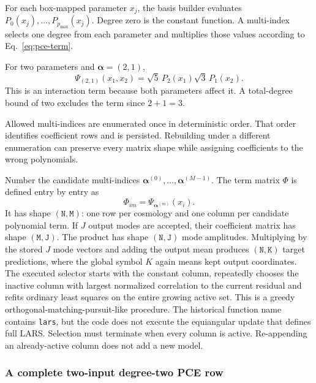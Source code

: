 \documentclass[10pt,aps,prd,twocolumn,nofootinbib]{revtex4-2}
\newcommand{\code}[1]{\texttt{#1}}
\newcommand{\shape}[1]{\ensuremath{\mathtt{#1}}}
\begin{document}
For each box-mapped parameter \(x_j\), the basis builder evaluates
\(P_0(x_j),\ldots,P_{p_{\max}}(x_j)\).  Degree zero is the constant function.
A multi-index selects one degree from each parameter and multiplies those
values according to Eq.~\eqref{eq:pce-term}.

For two parameters and \(\boldsymbol\alpha=(2,1)\),
\begin{equation*}
 \Psi_{(2,1)}(x_1,x_2)
 =\sqrt5\,P_2(x_1)\sqrt3\,P_1(x_2).
\end{equation*}
This is an interaction term because both parameters affect it.  A total-degree
bound of two excludes the term since \(2+1=3\).

Allowed multi-indices are enumerated once in deterministic order.  That order
identifies coefficient rows and is persisted.  Rebuilding under a different
enumeration can preserve every matrix shape while assigning coefficients to
the wrong polynomials.

Number the candidate multi-indices
$\boldsymbol\alpha^{(0)},\ldots,\boldsymbol\alpha^{(M-1)}$.  The term matrix
$\Phi$ is defined entry by entry as
\begin{equation*}
 \Phi_{im}=\Psi_{\boldsymbol\alpha^{(m)}}(x_i).
\end{equation*}
It has shape \shape{(N,M)}: one row per cosmology and one column per candidate
polynomial term.  If $J$ output modes are accepted, their coefficient matrix
has shape \shape{(M,J)}.  The product has shape \shape{(N,J)} mode amplitudes.
Multiplying by the stored $J$ mode vectors and adding the output mean produces
\shape{(N,K)} target predictions, where the global symbol $K$ again means
kept output coordinates.  The executed selector starts with the constant
column, repeatedly chooses the inactive column with largest normalized
correlation to the current residual and refits ordinary least squares on the
entire growing active set.  This is a greedy orthogonal-matching-pursuit-like
procedure.  The historical function name contains \code{lars}, but the code
does not execute the equiangular update that defines full LARS.  Selection
must terminate when every column is active.
Re-appending an already-active column does not add a new model.

\subsubsection{A complete two-input degree-two PCE row}
\end{document}
